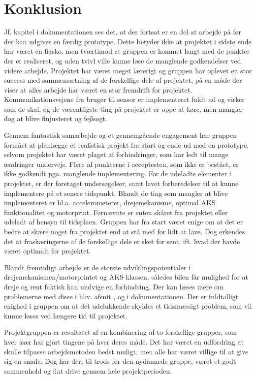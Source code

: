 \chapter{Konklusion}
\label{ch:Konklusion}

Jf. kapitel  i dokumentationen ses det, at der fortsat er en del at arbejde på før der kan udgives en færdig prototype. 
Dette betyder ikke at projektet i sidste ende har været en fiasko, men tværtimod at gruppen er kommet langt med de punkter der er realiseret, og uden tvivl ville kunne løse de manglende godkendelser ved videre arbejde. 
Projektet har været meget lærerigt og gruppen har oplevet en stor success med sammensætning af de forskellige dele af projektet, på en måde der viser at alles arbejde har været en stor fremdrift for projektet. 
Kommunikationsvejene fra bruger til sensor er implementeret fuldt ud og virker som de skal, og de væsentligste ting på projektet er oppe at køre, men mangler dog at blive finjusteret og fejlsøgt. 

Gennem fantastisk samarbejde og et gennemgående engagement har gruppen formået at planlægge et realistisk projekt fra start og ende ud med en prototype, selvom projektet har været plaget af forhindringer, som har ledt til mange ændringer undervejs. 
Flere af punkterne i acceptesten, som ikke er bestået, er ikke godkendt pga. manglende implementering. 
For de udeladte elementer i projektet, er der foretaget undersøgelser, samt lavet forberedelser til at kunne implementere på et senere tidspunkt. 
Blandt de ting som mangler at blive implementeret er bl.a. accelerometeret, drejemekanisme, optimal AKS funktionalitet og motorprint. 
Førnævnte er enten skåret fra projektet eller udeladt af hensyn til tidsplaen. Gruppen har fra start været enige om at det er bedre at skære noget fra projektet end at stå med for lidt at lave. 
Dog erkendes det at fraskæringerne af de forskellige dele er sket for sent, ift. hvad der havde været optimalt for projektet.

Blandt fremtidigt arbejde er de største udviklingspotentialer i drejemekanismen/motorprintet og AKS-klassen, således bilen får mulighed for at dreje og rent faktisk kan undvige en forhindring. 
Der kan læses mere om problemerne med disse i hhv. afsnit ,  og  i dokumentationen. 
Der er fuldtalligt enighed i gruppen om at det udelukkende skyldes et tidsmæssigt problem, som vil kunne løses ved længere tid til projektet.

Projektgruppen er resultatet af en kombinering af to forskellige grupper, som hver især har gjort tingene på hver deres måde. Det har været en udfordring at skulle tilpasse arbejdsmetoden bedst muligt, men alle har været villige til at give sig en smule. Dog har der, til trods for den nydannede gruppe, været et godt sammenhold og fint drive gennem hele projektperioden.


